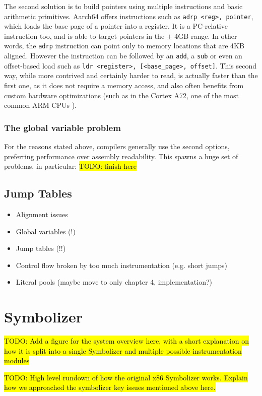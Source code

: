 \documentclass[a4paper,11pt,oneside]{report}
\newcommand{\todo}[1]{%
	\begingroup 
	\sethlcolor{cyan}%
	\hl{TODO: #1}%
	\endgroup
}
\begin{document}
The second solution is to build pointers using multiple instructions and basic 
arithmetic primitives. Aarch64 offers instructions such as \texttt{adrp <reg>, 
pointer}, which loads the base page of a pointer into a register. It is a 
PC-relative instruction too, and is able to target pointers in the $\pm$ 4GB 
range. In other words, the \texttt{adrp} instruction can point only to memory 
locations that are 4KB aligned. However the instruction can be followed by an 
\texttt{add}, a \texttt{sub} or even an offset-based load such as \texttt{ldr 
<register>, [<base\_page>, offset]}. This second way, while more contrived and 
certainly harder to read, is actually faster than the first one, as it does not 
require a memory access, and also often benefits from custom hardware 
optimizations (such as in the Cortex A72, one of the most common ARM CPUs 
\cite{pointeroptimizations}). 

\subsubsection{The global variable problem}
For the reasons stated above, compilers generally use the second options, 
preferring performance over assembly readability. This spawns a huge set of 
problems, in particular:  \todo{finish here}

\subsection{Jump Tables}


\begin{itemize}
	\item Alignment issues
	\item Global variables (!)
	\item Jump tables (!!)
	\item Control flow broken by too much instrumentation (e.g. short jumps)
	\item Literal pools (maybe move to only chapter 4, implementation?)
\end{itemize}


\section{Symbolizer}
\todo{Add a figure for the system overview here, with a short explanation on 
how it is split into a single Symbolizer and multiple possible instrumentation 
modules}

\todo{High level rundown of how the original x86 Symbolizer works.
Explain how we approached the symbolizer key issues mentioned above here.}
\end{document}
